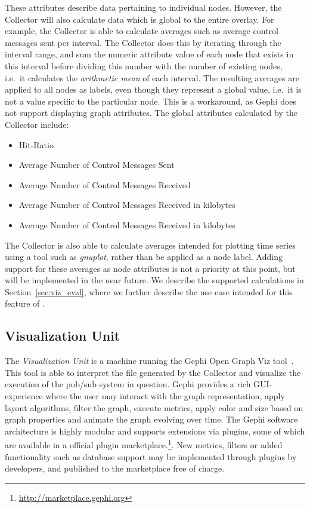 These attributes describe data pertaining to individual nodes. However,
the Collector will also calculate data which is global to the entire
overlay. For example, the Collector is able to calculate averages such
as average control messages sent per interval. The Collector does this
by iterating through the interval range, and sum the numeric attribute
value of each node that exists in this interval before dividing this
number with the number of existing nodes, i.e.\ it calculates the
\emph{arithmetic mean} of each interval. The resulting averages are
applied to all nodes as labels, even though they represent a global
value, i.e.\ it is not a value specific to the particular node. This is
a workaround, as Gephi does not support displaying graph attributes.
The global attributes calculated by the Collector include:

\begin{itemize}
    \item Hit-Ratio
    \item Average Number of Control Messages Sent
    \item Average Number of Control Messages Received
    \item Average Number of Control Messages Received in kilobytes
    \item Average Number of Control Messages Received in kilobytes
\end{itemize}

The Collector is also able to calculate averages intended for plotting
time series using a tool such as \emph{gnuplot}, rather than be applied as a
node label. Adding support for these averages as node attributes is not
a priority at this point, but will be implemented in the near future. We
describe the supported calculations in Section~\ref{sec:viz_eval}, where
we further describe the use case intended for this feature of \demo.

\subsection{Visualization Unit}
\label{sec:viz_unit}

The \emph{Visualization Unit} is a machine running the Gephi Open Graph
Viz tool~\cite{ICWSM09154}. This tool is able to interpret the \gexf{} file generated by
the Collector and visualize the execution of the pub/sub system in
question. Gephi provides a rich GUI-experience where the user may
interact with the graph representation, apply layout algorithms, filter
the graph, execute metrics, apply color and size based on graph
properties and animate the graph evolving over time. The Gephi software
architecture is highly modular and supports extensions via plugins, some
of which are available in a official plugin
marketplace.\footnote{\url{http://marketplace.gephi.org}}. New metrics,
filters or added functionality such as database support may be
implemented through plugins by developers, and published to the
marketplace free of charge.

